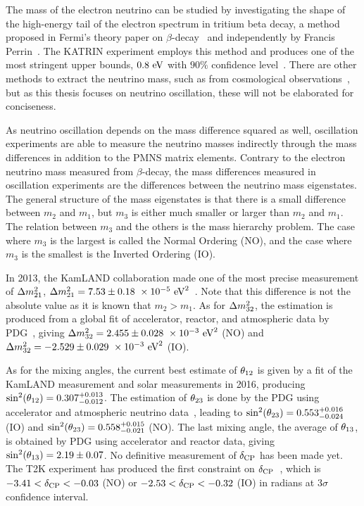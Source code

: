 The mass of the electron neutrino can be studied by investigating the shape of the high-energy tail of the electron spectrum in tritium beta decay, a method proposed in Fermi's theory paper on $\beta$-decay~\cite{Fermi:1934hr} and independently by Francis Perrin~\cite{Perrin1933}.
The KATRIN experiment employs this method and produces one of the most stringent upper bounds, $0.8~\textrm{eV}$ with $90\%$ confidence level~\cite{KATRIN:2021uub}.
There are other methods to extract the neutrino mass, such as from cosmological observations~\cite{Brieden:2022lsd}, but as this thesis focuses on neutrino oscillation, these will not be elaborated for conciseness.

As neutrino oscillation depends on the mass difference squared as well, oscillation experiments are able to measure the neutrino masses indirectly through the mass differences in addition to the PMNS matrix elements.
Contrary to the electron neutrino mass measured from $\beta$-decay, the mass differences measured in oscillation experiments are the differences between the neutrino mass eigenstates.
The general structure of the mass eigenstates is that there is a small difference between $m_2$ and $m_1$, but $m_3$ is either much smaller or larger than $m_2$ and $m_1$.
The relation between $m_3$ and the others is the mass hierarchy problem.
The case where $m_3$ is the largest is called the Normal Ordering (NO), and the case where $m_3$ is the smallest is the Inverted Ordering (IO).

In 2013, the KamLAND collaboration made one of the most precise measurement of $\Delta m^2_{21}$, $\Delta m^2_{21}=7.53\pm0.18~\times 10^{-5}~\textrm{eV}^2$~\cite{KamLAND:2013rgu}.
Note that this difference is not the absolute value as it is known that $m_2>m_1$.
As for $\Delta m^2_{32}$, the estimation is produced from a global fit of accelerator, reactor, and atmospheric data by PDG~\cite{ParticleDataGroup:2024cfk}, giving $\Delta m^2_{32}=2.455\pm0.028~\times 10^{-3}~\textrm{eV}^2$ (NO) and $\Delta m^2_{32}=-2.529\pm0.029~\times 10^{-3}~\textrm{eV}^2$ (IO).

As for the mixing angles, the current best estimate of $\theta_{12}$ is given by a fit of the KamLAND measurement and solar measurements in 2016, producing $\sin^2(\theta_{12})=0.307^{+0.013}_{-0.012}$.
The estimation of $\theta_{23}$ is done by the PDG using accelerator and atmospheric neutrino data~\cite{ParticleDataGroup:2024cfk}, leading to $\sin^2(\theta_{23})=0.553^{+0.016}_{-0.024}$ (IO) and $\sin^2(\theta_{23})=0.558^{+0.015}_{-0.021}$ (NO).
The last mixing angle, the average of $\theta_{13}$, is obtained by PDG using accelerator and reactor data, giving $\sin^2(\theta_{13})=2.19\pm0.07$.
No definitive measurement of $\delta_\textrm{CP}$ has been made yet. 
The T2K experiment has produced the first constraint on $\delta_\textrm{CP}$~\cite{T2K:2019bcf}, which is $-3.41<\delta_\textrm{CP}<-0.03$ (NO) or $-2.53<\delta_\textrm{CP}<-0.32$ (IO) in radians at $3\sigma$ confidence interval.

